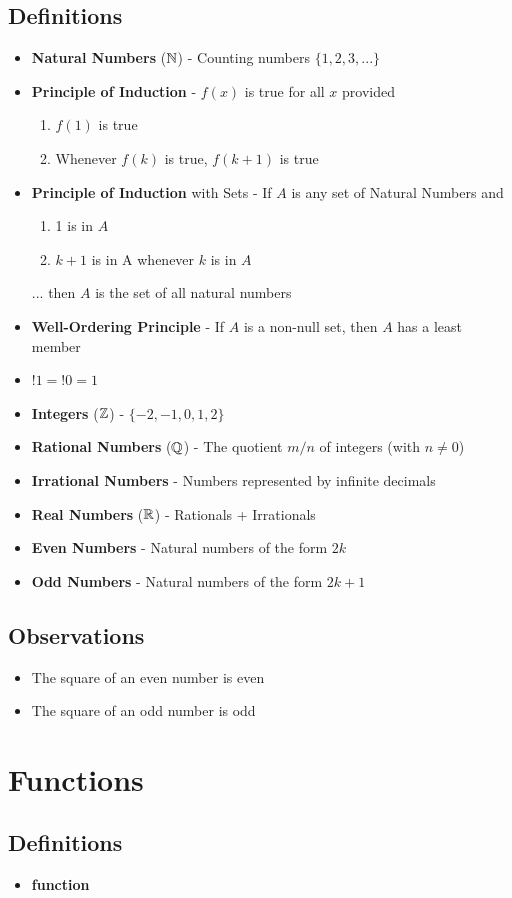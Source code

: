 \subsection*{Definitions}
\begin{itemize}
	\item \textbf{Natural Numbers} ($\NN$) - Counting numbers $\{1 ,2, 3, ...\}$
	\item \textbf{Principle of Induction} - $f(x)$ is true for all $x$ provided
		\begin{enumerate}
			\item $f(1)$ is true
			\item Whenever $f(k)$ is true, $f(k+1)$ is true
		\end{enumerate}
	\item \textbf{Principle of Induction} with Sets - If $A$ is any set of Natural Numbers and
		\begin{enumerate}
			\item 1 is in $A$
			\item $k+1$ is in A whenever $k$ is in $A$
		\end{enumerate} 
	 ...  then $A$ is the set of all natural numbers
	 \item \textbf{Well-Ordering Principle} - If  $A$ is a non-null set, then $A$ has a least member
	 \item $!1 = !0 = 1$
	 \item \textbf{Integers} (${\ZZ}$) - $\{-2, -1, 0, 1 , 2\}$
	 \item \textbf{Rational Numbers} (${\QQ}$) - The quotient $m/n$ of integers (with $n \neq 0$)
     \item \textbf{Irrational Numbers} - Numbers represented by infinite decimals
	 \item \textbf{Real Numbers} (${\RR}$) - Rationals + Irrationals
	 \item \textbf{Even Numbers} - Natural numbers of the form $2k$
	 \item \textbf{Odd Numbers} - Natural numbers of the form $2k + 1$
\end{itemize}
\subsection*{Observations}
\begin{itemize}
	\item The square of an even number is even
	\item The square of an odd number is odd
\end{itemize}

\section{Functions}
\subsection*{Definitions}
\begin{itemize}
	\item \textbf{function}
\end{itemize}
